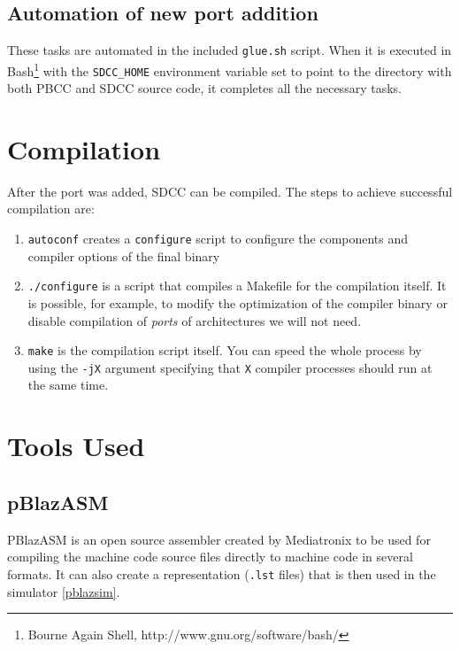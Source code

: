         \subsection{Automation of new port addition}

        These tasks are automated in the included \texttt{glue.sh} script. When it is executed in  Bash\footnote{Bourne Again Shell, http://www.gnu.org/software/bash/} with the \texttt{SDCC\_HOME} environment variable set to point to the directory with both PBCC and SDCC source code, it completes all the necessary tasks.

    \section{Compilation}

    After the port was added, SDCC can be compiled. The steps to achieve successful compilation are:

    \begin{enumerate}
    \item \texttt{autoconf} creates a \texttt{configure} script to configure the components and compiler options of the final binary
    \item \texttt{./configure} is a script that compiles a Makefile for the compilation itself. It is possible, for example, to modify the optimization of the compiler binary or disable compilation of \emph{ports} of architectures we will not need.
    \item \texttt{make} is the compilation script itself. You can speed the whole process by using the \texttt{-jX} argument specifying that \texttt{X} compiler processes should run at the same time.
    \end{enumerate}

    \section{Tools Used}

        \subsection{pBlazASM}\label{pblazasm}

        PBlazASM is an open source assembler created by Mediatronix to be used for compiling the machine code source files directly to machine code in several formats. It can also create a representation (\texttt{.lst} files) that is then used in the simulator \ref{pblazsim}.

